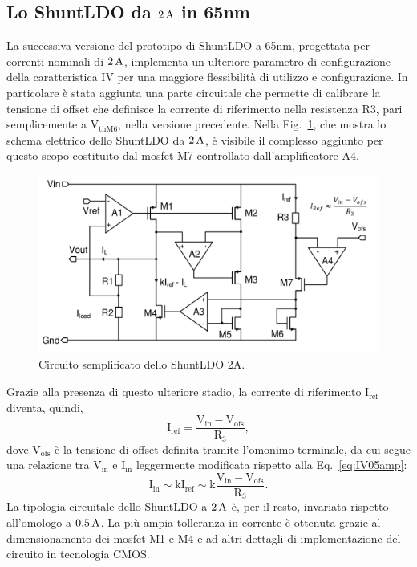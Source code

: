 \subsection{Lo ShuntLDO da $2\rm \, A$ in 65nm}
\label{SLDO2A}

La successiva versione del prototipo di ShuntLDO a 65nm, progettata per correnti nominali di $2\rm \, A$, implementa un ulteriore parametro di configurazione della caratteristica IV per una maggiore flessibilit\`a di utilizzo e configurazione. In particolare \`e stata aggiunta una parte circuitale che permette di calibrare la tensione di offset che definisce la corrente di riferimento nella resistenza R3, pari semplicemente a $\mathrm{V_{thM6}}$, nella versione precedente. Nella Fig.~\ref{SLDO2A}, che mostra lo schema elettrico dello ShuntLDO da $2\rm \, A$, \`e visibile il complesso aggiunto per questo scopo costituito dal mosfet M7 controllato dall'amplificatore A4.
\begin{figure}[!htbp]
\centering
\includegraphics[width=\linewidth]{Immagini/SLDO2A}
\caption{Circuito semplificato dello ShuntLDO 2A.}
\label{SLDO2A}
\end{figure}
Grazie alla presenza di questo ulteriore stadio, la corrente di riferimento $\mathrm{I_{ref}}$ diventa, quindi,
\begin{equation}
\mathrm{I_{ref} = \frac{V_{in} - V_{ofs}}{R_3}},
\end{equation}
dove $\mathrm{V_{ofs}}$ \`e la tensione di offset definita tramite l'omonimo terminale, da cui segue una relazione tra $\mathrm{V_{in}}$ e $\mathrm{I_{in}}$ leggermente modificata rispetto alla Eq.~\ref{eq:IV05amp}: 
\begin{equation}
\mathrm{I_{in} \sim k I_{ref} \sim k \frac{V_{in} - V_{ofs}}{R_3}}.
\end{equation}
La tipologia circuitale dello ShuntLDO a $2\rm \, A$ \`e, per il resto, invariata rispetto all'omologo a $0.5\rm \, A$. La pi\`u ampia tolleranza in corrente \`e ottenuta grazie al dimensionamento dei mosfet M1 e M4 e ad altri dettagli di implementazione del circuito in tecnologia CMOS.

